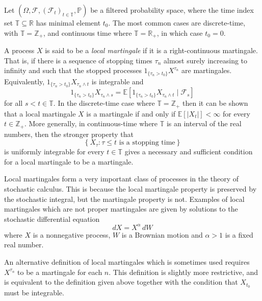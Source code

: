 \documentclass[12pt]{article}
\begin{document}

Let $(\Omega,\mathcal{F},(\mathcal{F}_t)_{t\in\mathbb{T}},\mathbb{P})$ be a filtered probability space, where the time index set $\mathbb{T}\subseteq\mathbb{R}$ has minimal element $t_0$. The most common cases are discrete-time, with $\mathbb{T}=\mathbb{Z}_+$, and continuous time where $\mathbb{T}=\mathbb{R}_+$, in which case $t_0=0$.

A process $X$ is said to be a \emph{local martingale} if it is  a right-continuous martingale. That is, if there is a sequence of stopping times $\tau_n$ almost surely increasing to infinity and such that the stopped processes $1_{\{\tau_n>t_0\}}X^{\tau_n}$ are martingales. Equivalently, $1_{\{\tau_n>t_0\}}X_{\tau_n\wedge t}$ is integrable and
\begin{equation*}
1_{\{\tau_n>t_0\}}X_{\tau_n\wedge s}=\mathbb{E}[1_{\{\tau_n>t_0\}}X_{\tau_n\wedge t}\mid\mathcal{F}_s]
\end{equation*}
for all $s<t\in\mathbb{T}$.
In the discrete-time case where $\mathbb{T}=\mathbb{Z}_+$ then it can be shown that a local martingale $X$ is a martingale if and only if $\mathbb{E}[|X_t|]<\infty$ for every $t\in\mathbb{Z}_+$.
More generally, in continuous-time where $\mathbb{T}$ is an interval of the real numbers, then the stronger property that
\begin{equation*}
\left\{X_{\tau}:\tau\le t\textrm{ is a stopping time}\right\}
\end{equation*}
is uniformly integrable for every $t\in\mathbb{T}$ gives a necessary and sufficient condition for a local martingale to be a martingale.

Local martingales form a very important class of processes in the theory of stochastic calculus. This is because the local martingale property is preserved by the stochastic integral, but the martingale property is not.
Examples of local martingales which are not proper martingales are given by solutions to the stochastic differential equation
\begin{equation*}
dX = X^{\alpha}\,dW
\end{equation*}
where $X$ is a nonnegative process, $W$ is a Brownian motion and $\alpha>1$ is a fixed real number.

An alternative definition of local martingales which is sometimes used requires $X^{\tau_n}$ to be a martingale for each $n$. This definition is slightly more restrictive, and is equivalent to the definition given above together with the condition that $X_{t_0}$ must be integrable.


\end{document}
